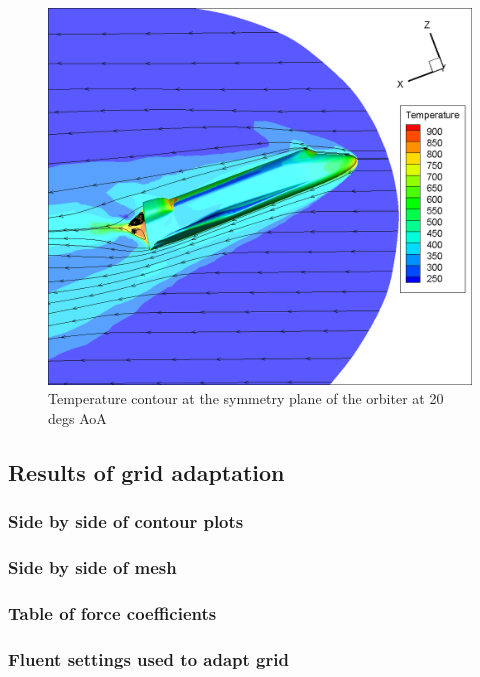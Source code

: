 \begin{figure}[H]
 \centering
 \includegraphics[width=\textwidth]{report_images/20_sym_temp_contour.png}
 \caption{Temperature contour at the symmetry plane of the orbiter at 20 degs AoA}
 \label{fig: 20_sym_temp_contour}
\end{figure}

\subsection{Results of grid adaptation}

\subsubsection{Side by side of contour plots}

\subsubsection{Side by side of mesh}

\subsubsection{Table of force coefficients}

\subsubsection{Fluent settings used to adapt grid}